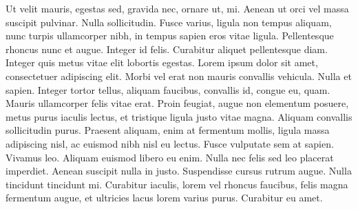 \documentclass{rgtmg} %
\begin{document}
Ut velit mauris, egestas sed, gravida nec, ornare ut, mi. Aenean ut orci vel massa suscipit pulvinar. Nulla sollicitudin. Fusce varius, ligula non tempus aliquam, nunc turpis ullamcorper nibh, in tempus sapien eros vitae ligula. Pellentesque rhoncus nunc et augue. Integer id felis. Curabitur aliquet pellentesque diam. Integer quis metus vitae elit lobortis egestas. Lorem ipsum dolor sit amet, consectetuer adipiscing elit. Morbi vel erat non mauris convallis vehicula. Nulla et sapien. Integer tortor tellus, aliquam faucibus, convallis id, congue eu, quam. Mauris ullamcorper felis vitae erat. Proin feugiat, augue non elementum posuere, metus purus iaculis lectus, et tristique ligula justo vitae magna.
Aliquam convallis sollicitudin purus. Praesent aliquam, enim at fermentum mollis, ligula massa adipiscing nisl, ac euismod nibh nisl eu lectus. Fusce vulputate sem at sapien. Vivamus leo. Aliquam euismod libero eu enim. Nulla nec felis sed leo placerat imperdiet. Aenean suscipit nulla in justo. Suspendisse cursus rutrum augue. Nulla tincidunt tincidunt mi. Curabitur iaculis, lorem vel rhoncus faucibus, felis magna fermentum augue, et ultricies lacus lorem varius purus. Curabitur eu amet.




\end{document}
